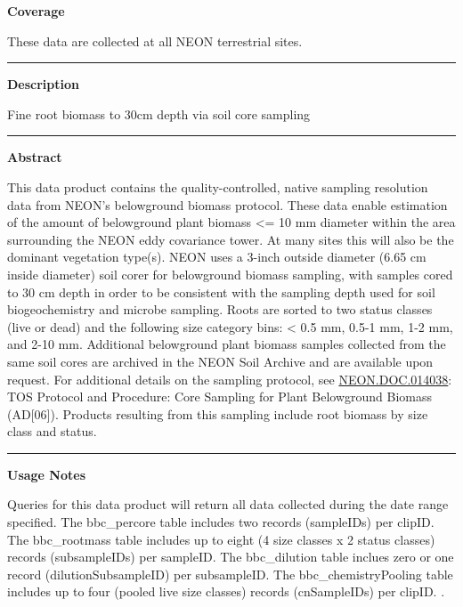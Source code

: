 \documentclass[]{article}
\begin{document}
\textbf{Coverage}

These data are collected at all NEON terrestrial sites.

\begin{center}\rule{0.5\linewidth}{\linethickness}\end{center}

\textbf{Description}

Fine root biomass to 30cm depth via soil core sampling

\begin{center}\rule{0.5\linewidth}{\linethickness}\end{center}

\textbf{Abstract}

This data product contains the quality-controlled, native sampling
resolution data from NEON's belowground biomass protocol. These data
enable estimation of the amount of belowground plant biomass
\textless{}= 10 mm diameter within the area surrounding the NEON eddy
covariance tower. At many sites this will also be the dominant
vegetation type(s). NEON uses a 3-inch outside diameter (6.65 cm inside
diameter) soil corer for belowground biomass sampling, with samples
cored to 30 cm depth in order to be consistent with the sampling depth
used for soil biogeochemistry and microbe sampling. Roots are sorted to
two status classes (live or dead) and the following size category bins:
\textless{} 0.5 mm, 0.5-1 mm, 1-2 mm, and 2-10 mm. Additional
belowground plant biomass samples collected from the same soil cores are
archived in the NEON Soil Archive and are available upon request. For
additional details on the sampling protocol, see
\href{http://data.neonscience.org/api/v0/documents/NEON.DOC.014038vE}{NEON.DOC.014038}:
TOS Protocol and Procedure: Core Sampling for Plant Belowground Biomass
(AD{[}06{]}). Products resulting from this sampling include root biomass
by size class and status.

\begin{center}\rule{0.5\linewidth}{\linethickness}\end{center}

\textbf{Usage Notes}

Queries for this data product will return all data collected during the
date range specified. The bbc\_percore table includes two records
(sampleIDs) per clipID. The bbc\_rootmass table includes up to eight (4
size classes x 2 status classes) records (subsampleIDs) per sampleID.
The bbc\_dilution table inclues zero or one record (dilutionSubsampleID)
per subsampleID. The bbc\_chemistryPooling table includes up to four
(pooled live size classes) records (cnSampleIDs) per clipID. \newpage
.
\end{document}
